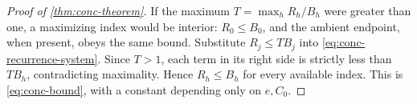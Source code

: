 \begin{proof}[Proof of \cref{thm:conc-theorem}]
If the maximum $T=\max_h R_h/B_h$ were greater than one, a maximizing index would be interior: $R_0\leq B_0$, and the ambient endpoint, when present, obeys the same bound.  Substitute $R_j\leq TB_j$ into \eqref{eq:conc-recurrence-system}.  Since $T>1$, each term in its right side is strictly less than $TB_h$, contradicting maximality.  Hence $R_h\leq B_h$ for every available index.  This is \eqref{eq:conc-bound}, with a constant depending only on $e,C_0$.
\end{proof}
